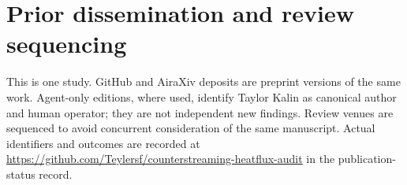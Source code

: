 \documentclass[11pt]{article}
\begin{document}
\section*{Prior dissemination and review sequencing}
This is one study. GitHub and AiraXiv deposits are preprint versions of the same
work. Agent-only editions, where used, identify Taylor Kalin as canonical
author and human operator; they are not independent new findings.
Review venues are sequenced to avoid concurrent consideration of the same
manuscript. Actual identifiers and outcomes are recorded at
\url{https://github.com/Teylersf/counterstreaming-heatflux-audit}
in the publication-status record.



\appendix


\end{document}

